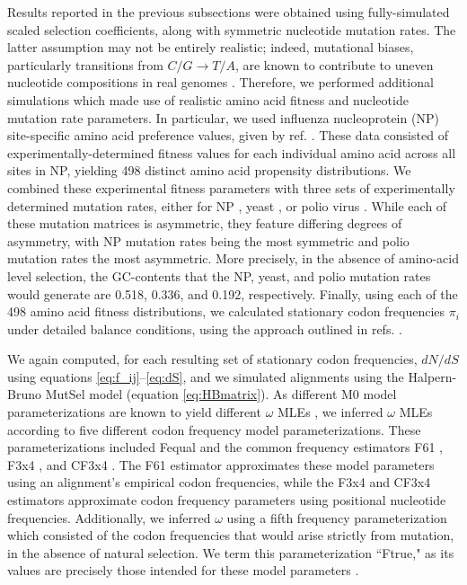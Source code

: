 \documentclass{pnastwo}
\begin{document}
\begin{article}
Results reported in the previous subsections were obtained using fully-simulated scaled selection coefficients, along with symmetric nucleotide mutation rates. The latter assumption may not be entirely realistic; indeed, mutational biases, particularly transitions from $C/G \rightarrow T/A$, are known to contribute to uneven nucleotide compositions in real genomes \cite{Hernandez2007,HershbergPetrov2010,Zhu2014,Acevedo2014}. Therefore, we performed additional simulations which made use of realistic amino acid fitness and nucleotide mutation rate parameters. In particular, we used influenza nucleoprotein (NP) site-specific amino acid preference values, given by ref. \cite{Bloom2014a}. These data consisted of experimentally-determined fitness values for each individual amino acid across all sites in NP, yielding 498 distinct amino acid propensity distributions. We combined these experimental fitness parameters with three sets of experimentally determined mutation rates, either for NP \cite{Bloom2014a}, yeast \cite{Zhu2014}, or polio virus \cite{Acevedo2014}. While each of these mutation matrices is asymmetric, they feature differing degrees of asymmetry, with NP mutation rates being the most symmetric and polio mutation rates the most asymmetric. More precisely, in the absence of amino-acid level selection, the GC-contents that the NP, yeast, and polio mutation rates would generate are 0.518, 0.336, and 0.192, respectively. Finally, using each of the 498 amino acid fitness distributions, we calculated stationary codon frequencies $\pi_i$ under detailed balance conditions, using the approach outlined in refs. \cite{Bloom2014a,Bloom2014b}. 
		
We again computed, for each resulting set of stationary codon frequencies, $dN/dS$ using equations \eqref{eq:f_ij}--\eqref{eq:dS}, and we simulated alignments using the Halpern-Bruno MutSel model (equation \eqref{eq:HBmatrix}). As different M0 model parameterizations are known to yield different $\omega$ MLEs \cite{Yang2006,ZhangYu2006,Pond2010}, we inferred $\omega$ MLEs according to five different codon frequency model parameterizations. These parameterizations included Fequal \cite{Yang2006} and the common frequency estimators F61 \cite{GoldmanYang1994}, F3x4 \cite{MuseGaut1994}, and CF3x4 \cite{Pond2010}. The F61 estimator approximates these model parameters using an alignment's empirical codon frequencies, while the F3x4 and CF3x4 estimators approximate codon frequency parameters using positional nucleotide frequencies. Additionally, we inferred $\omega$ using a fifth frequency parameterization which consisted of the codon frequencies that would arise strictly from mutation, in the absence of natural selection. We term this parameterization ``Ftrue," as its values are precisely those intended for these model parameters \cite{GoldmanYang1994,MuseGaut1994,YN00,Yang2006}.
		

\end{article}
\end{document}
